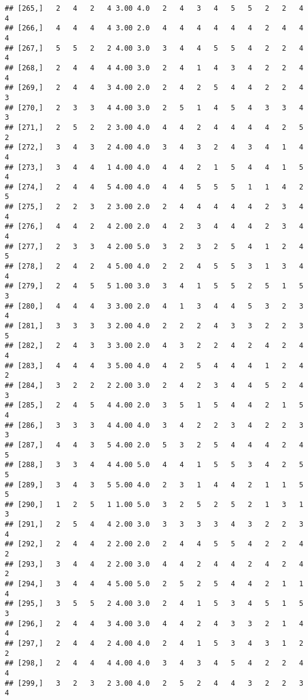\documentclass[]{article}
\begin{document}
\begin{verbatim}
## [265,]   2   4   2   4 3.00 4.0   2   4   3   4   5   5   2   2   4   4
## [266,]   4   4   4   4 3.00 2.0   4   4   4   4   4   4   2   4   4   4
## [267,]   5   5   2   2 4.00 3.0   3   4   4   5   5   4   2   2   4   4
## [268,]   2   4   4   4 4.00 3.0   2   4   1   4   3   4   2   2   4   4
## [269,]   2   4   4   3 4.00 2.0   2   4   2   5   4   4   2   2   4   3
## [270,]   2   3   3   4 4.00 3.0   2   5   1   4   5   4   3   3   4   3
## [271,]   2   5   2   2 3.00 4.0   4   4   2   4   4   4   4   2   5   2
## [272,]   3   4   3   2 4.00 4.0   3   4   3   2   4   3   4   1   4   4
## [273,]   3   4   4   1 4.00 4.0   4   4   2   1   5   4   4   1   5   4
## [274,]   2   4   4   5 4.00 4.0   4   4   5   5   5   1   1   4   2   5
## [275,]   2   2   3   2 3.00 2.0   2   4   4   4   4   4   2   3   4   4
## [276,]   4   4   2   4 2.00 2.0   4   2   3   4   4   4   2   3   4   4
## [277,]   2   3   3   4 2.00 5.0   3   2   3   2   5   4   1   2   4   5
## [278,]   2   4   2   4 5.00 4.0   2   2   4   5   5   3   1   3   4   4
## [279,]   2   4   5   5 1.00 3.0   3   4   1   5   5   2   5   1   5   3
## [280,]   4   4   4   3 3.00 2.0   4   1   3   4   4   5   3   2   3   4
## [281,]   3   3   3   3 2.00 4.0   2   2   2   4   3   3   2   2   3   5
## [282,]   2   4   3   3 3.00 2.0   4   3   2   2   4   2   4   2   4   4
## [283,]   4   4   4   3 5.00 4.0   4   2   5   4   4   4   1   2   4   2
## [284,]   3   2   2   2 2.00 3.0   2   4   2   3   4   4   5   2   4   3
## [285,]   2   4   5   4 4.00 2.0   3   5   1   5   4   4   2   1   5   4
## [286,]   3   3   3   4 4.00 4.0   3   4   2   2   3   4   2   2   3   3
## [287,]   4   4   3   5 4.00 2.0   5   3   2   5   4   4   4   2   4   5
## [288,]   3   3   4   4 4.00 5.0   4   4   1   5   5   3   4   2   5   5
## [289,]   3   4   3   5 5.00 4.0   2   3   1   4   4   2   1   1   5   5
## [290,]   1   2   5   1 1.00 5.0   3   2   5   2   5   2   1   3   1   3
## [291,]   2   5   4   4 2.00 3.0   3   3   3   3   4   3   2   2   3   4
## [292,]   2   4   4   2 2.00 2.0   2   4   4   5   5   4   2   2   4   2
## [293,]   3   4   4   2 2.00 3.0   4   4   2   4   4   2   4   2   4   2
## [294,]   3   4   4   4 5.00 5.0   2   5   2   5   4   4   2   1   1   4
## [295,]   3   5   5   2 4.00 3.0   2   4   1   5   3   4   5   1   5   3
## [296,]   2   4   4   3 4.00 3.0   4   4   2   4   3   3   2   1   4   4
## [297,]   2   4   4   2 4.00 4.0   2   4   1   5   3   4   3   1   2   2
## [298,]   2   4   4   4 4.00 4.0   3   4   3   4   5   4   2   2   4   4
## [299,]   3   2   3   2 3.00 4.0   2   5   2   4   4   3   2   2   3   4

\end{verbatim}
\end{document}
